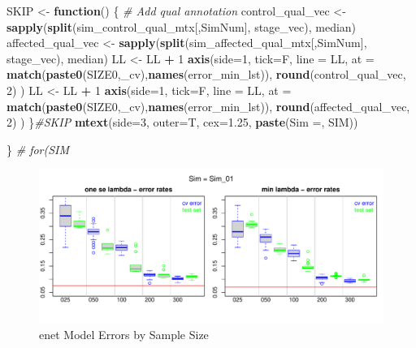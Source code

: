 \documentclass[
]{book}
\newenvironment{Shaded}{\begin{snugshade}}{\end{snugshade}}
\newcommand{\CommentTok}[1]{\textcolor[rgb]{0.56,0.35,0.01}{\textit{#1}}}
\newcommand{\ControlFlowTok}[1]{\textcolor[rgb]{0.13,0.29,0.53}{\textbf{#1}}}
\newcommand{\DataTypeTok}[1]{\textcolor[rgb]{0.13,0.29,0.53}{#1}}
\newcommand{\DecValTok}[1]{\textcolor[rgb]{0.00,0.00,0.81}{#1}}
\newcommand{\FloatTok}[1]{\textcolor[rgb]{0.00,0.00,0.81}{#1}}
\newcommand{\KeywordTok}[1]{\textcolor[rgb]{0.13,0.29,0.53}{\textbf{#1}}}
\newcommand{\NormalTok}[1]{#1}
\newcommand{\OperatorTok}[1]{\textcolor[rgb]{0.81,0.36,0.00}{\textbf{#1}}}
\newcommand{\StringTok}[1]{\textcolor[rgb]{0.31,0.60,0.02}{#1}}
\begin{document}
\begin{Shaded}
\begin{Highlighting}[]
\NormalTok{SKIP  <{-}}\StringTok{ }\ControlFlowTok{function}\NormalTok{() \{}
\CommentTok{\# Add qual annotation}
\NormalTok{control\_qual\_vec <{-}}\StringTok{ }\KeywordTok{sapply}\NormalTok{(}\KeywordTok{split}\NormalTok{(sim\_control\_qual\_mtx[,SimNum], stage\_vec), median)}
\NormalTok{affected\_qual\_vec <{-}}\StringTok{ }\KeywordTok{sapply}\NormalTok{(}\KeywordTok{split}\NormalTok{(sim\_affected\_qual\_mtx[,SimNum], stage\_vec), median)}
\NormalTok{LL <{-}}\StringTok{ }\NormalTok{LL }\OperatorTok{+}\StringTok{ }\DecValTok{1}
\KeywordTok{axis}\NormalTok{(}\DataTypeTok{side=}\DecValTok{1}\NormalTok{, }\DataTypeTok{tick=}\NormalTok{F, }\DataTypeTok{line =}\NormalTok{ LL,}
  \DataTypeTok{at =} \KeywordTok{match}\NormalTok{(}\KeywordTok{paste0}\NormalTok{(SIZE0,}\StringTok{\textquotesingle{}\_cv\textquotesingle{}}\NormalTok{),}\KeywordTok{names}\NormalTok{(error\_min\_lst)),}
  \KeywordTok{round}\NormalTok{(control\_qual\_vec, }\DecValTok{2}\NormalTok{)}
\NormalTok{ )}
\NormalTok{LL <{-}}\StringTok{ }\NormalTok{LL }\OperatorTok{+}\StringTok{ }\DecValTok{1}
\KeywordTok{axis}\NormalTok{(}\DataTypeTok{side=}\DecValTok{1}\NormalTok{, }\DataTypeTok{tick=}\NormalTok{F, }\DataTypeTok{line =}\NormalTok{ LL,}
  \DataTypeTok{at =} \KeywordTok{match}\NormalTok{(}\KeywordTok{paste0}\NormalTok{(SIZE0,}\StringTok{\textquotesingle{}\_cv\textquotesingle{}}\NormalTok{),}\KeywordTok{names}\NormalTok{(error\_min\_lst)),}
  \KeywordTok{round}\NormalTok{(affected\_qual\_vec, }\DecValTok{2}\NormalTok{)}
\NormalTok{ )}
\NormalTok{\}}\CommentTok{\#SKIP}
\KeywordTok{mtext}\NormalTok{(}\DataTypeTok{side=}\DecValTok{3}\NormalTok{, }\DataTypeTok{outer=}\NormalTok{T, }\DataTypeTok{cex=}\FloatTok{1.25}\NormalTok{, }\KeywordTok{paste}\NormalTok{(}\StringTok{\textquotesingle{}Sim =\textquotesingle{}}\NormalTok{,  SIM))}

\NormalTok{\} }\CommentTok{\# for(SIM}
\end{Highlighting}
\end{Shaded}

\begin{figure}
\centering
\includegraphics{Static/figures/hcc5hmC-glmnetSuiteB-enet-simRes-errors-bySim-1.pdf}
\caption{\label{fig:hcc5hmC-glmnetSuiteB-enet-simRes-errors-bySim}enet Model Errors by Sample Size}
\end{figure}
\end{document}
